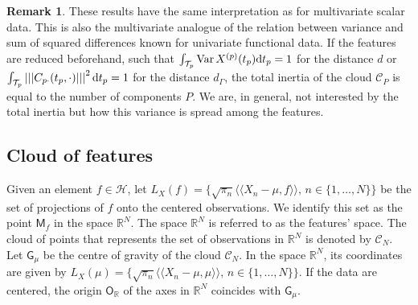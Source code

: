 \documentclass[times,sort&compress,3p]{elsarticle}
\theoremstyle{plain}%
\theoremstyle{definition}
\newtheorem{remark}{Remark}
\newcommand{\RR}{\mathbb{R}} %
\newcommand{\dd}{{\rm d}}
\newcommand{\TT}[1]{\mathcal{T}_{#1}} %
\newcommand{\HH}{\mathcal{H}} %
\newcommand{\inH}[2]{\langle\!\langle#1, #2\rangle\!\rangle}
\newcommand{\normH}[1]{\left|\left|\left|#1\right|\right|\right|}
\newcommand{\Xp}[1]{X^{(#1)}} %
\newcommand{\CN}{\mathcal{C}_{\!N}} %
\newcommand{\pfea}[1]{\mathsf{#1}} %
\newcommand{\CP}{\mathcal{C}_{\!P}} %
\newcommand{\Gfea}{\pfea{G}_{\!\mu}} %
\newcommand{\OG}{\pfea{O}_{\!\RR}} %
\DeclareMathOperator{\Var}{Var}
\begin{document}
\begin{remark}
    These results have the same interpretation as for multivariate scalar data. This is also the multivariate analogue of the relation between variance and sum of squared differences known for univariate functional data. If the features are reduced beforehand, such that $\int_{\TT{p}} \Var\Xp{p} (t_p) \dd t_p = 1$ for the distance $d$ or $\int_{\TT{p}} \normH{C_{p \cdot}(t_p, \cdot)}^2 \dd t_p = 1$ for the distance $d_\Gamma$, the total inertia of the cloud $\CP$ is equal to the number of components $P$. We are, in general, not interested by the total inertia but how this variance is spread among the features.
\end{remark}


\subsection{Cloud of features} %
\label{sub:cloud_of_features}

Given an element $f \in \HH$, let $L_X(f) = \{\sqrt{\pi_n}\inH{X_n - \mu}{f},\,n \in \{1, \dots, N\}\}$ be the set of projections of $f$ onto the centered observations. We identify this set as the point $\pfea{M}_f$ in the space $\RR^N$. The space $\RR^N$ is referred to as the features' space. The cloud of points that represents the set of observations in $\RR^N$ is denoted by $\CN$. Let $\Gfea$ be the centre of gravity of the cloud $\CN$. In the space $\RR^N$, its coordinates are given by $L_X(\mu) = \{\sqrt{\pi_n}\inH{X_n - \mu}{\mu},\,n \in \{1, \dots, N\}\}$. If the data are centered, the origin $\OG$ of the axes in $\RR^N$ coincides with $\Gfea$.
\end{document}
